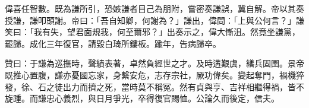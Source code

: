 \begin{pinyinscope}
偉喜任智數。既為謙所引，恐嫉謙者目己為朋附，嘗密奏謙誤，冀自解。帝以其奏授謙，謙叩頭謝。帝曰：「吾自知卿，何謝為？」謙出，偉問：「上與公何言？」謙笑曰：「我有失，望君面規我，何至爾邪？」出奏示之，偉大慚沮。然竟坐謙黨，罷歸。成化三年復官，請毀白琦所鏤板。踰年，告病歸卒。

贊曰：于謙為巡撫時，聲績表著，卓然負經世之才。及時遘艱虞，繕兵固圉。景帝既推心置腹，謙亦憂國忘家，身繫安危，志存宗社，厥功偉矣。變起奪門，禍機猝發，徐、石之徒出力而擠之死，當時莫不稱冤。然有貞與亨、吉祥相繼得禍，皆不旋踵。而謙忠心義烈，與日月爭光，卒得復官賜恤。公論久而後定，信夫。


\end{pinyinscope}